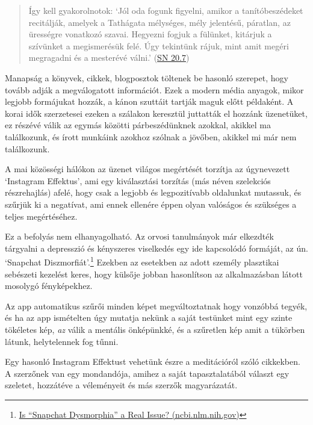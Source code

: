 \begin{quote}
Így kell gyakorolnotok: `Jól oda fogunk figyelni, amikor a
tanítóbeszédeket recitálják, amelyek a Tathágata mélységes, mély
jelentésű, páratlan, az ürességre vonatkozó szavai. Hegyezni fogjuk a
fülünket, kitárjuk a szívünket a megismerésük felé. Úgy tekintünk rájuk,
mint amit megéri megragadni és a mesterévé válni.'
(\href{https://a-buddha-ujja.hu/sn-20.7/hu/fenyvesi-robert}{SN 20.7})
\end{quote}

Manapság a könyvek, cikkek, blogposztok töltenek be hasonló szerepet,
hogy tovább adják a megválogatott információt. Ezek a modern média
anyagok, mikor legjobb formájukat hozzák, a kánon szuttáit tartják maguk
előtt példaként. A korai idők szerzetesei ezeken a szálakon keresztül
juttatták el hozzánk üzenetüket, ez részévé válik az egymás közötti
párbeszédünknek azokkal, akikkel ma találkozunk, és írott munkáink
azokhoz szólnak a jövőben, akikkel mi már nem találkozunk.

\clearpage

\vspace*{-\baselineskip}


A mai közösségi hálókon az üzenet világos megértését torzítja az úgynevezett `Instagram Effektus',
ami egy kiválasztási torzítás (más néven szelekciós részrehajlás) afelé,
hogy csak a legjobb és legpozitívabb oldalunkat mutassuk, és szűrjük ki
a negatívat, ami ennek ellenére éppen olyan valóságos és szükséges a
teljes megértéséhez.

Ez a befolyás nem elhanyagolható. Az orvosi tanulmányok már elkezdték
tárgyalni a depresszió és kényszeres viselkedés egy ide kapcsolódó
formáját, az ún. `Snapchat Diszmorfiát'.\footnote{\href{https://www.ncbi.nlm.nih.gov/pmc/articles/PMC5933578/}{Is
  ``Snapchat Dysmorphia'' a Real Issue? (ncbi.nlm.nih.gov)}} Ezekben az
esetekben az adott személy plasztikai sebészeti kezelést keres, hogy
külsője jobban hasonlítson az alkalmazásban látott mosolygó
fényképekhez.

Az app automatikus szűrői minden képet megváltoztatnak hogy vonzóbbá
tegyék, és ha az app ismételten úgy mutatja nekünk a saját testünket
mint egy szinte tökéletes kép, \emph{az} válik a mentális önképünkké, és
a szűretlen kép amit a tükörben látunk, helytelennek fog tűnni.

Egy hasonló Instagram Effektust vehetünk észre a meditációról szóló
cikkekben. A szerzőnek van egy mondandója, amihez a saját
tapasztalatából választ egy szeletet, hozzátéve a véleményeit és más
szerzők magyarázatát.

